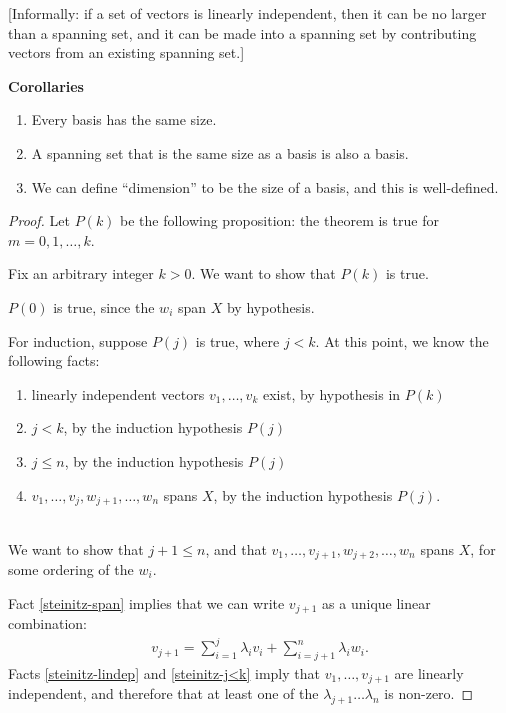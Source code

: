 \documentclass[12pt]{article}
\begin{document}
[Informally: if a set of vectors is linearly independent, then it can be no
larger than a spanning set, and it can be made into a spanning set by
contributing vectors from an existing spanning set.]

\textbf{Corollaries}
\begin{enumerate}
\item Every basis has the same size.
\item A spanning set that is the same size as a basis is also a basis.
\item We can define ``dimension'' to be the size of a basis, and this is
  well-defined.
\end{enumerate}

\begin{proof}
  Let $P(k)$ be the following proposition: the theorem is true for $m = 0, 1, \ldots, k$.

  Fix an arbitrary integer $k > 0$. We want to show that $P(k)$ is true.

  $P(0)$ is true, since the $w_i$ span $X$ by hypothesis.

  For induction, suppose $P(j)$ is true, where $j < k$. At this point, we know
  the following facts:~\\

  \begin{enumerate}[label=\roman*)]
  \item linearly independent vectors $v_1, \ldots, v_k$ exist, by hypothesis in
    $P(k)$ \label{steinitz-lindep}
  \item $j < k$, by the induction hypothesis $P(j)$ \label{steinitz-j<k}
  \item $j \leq n$, by the induction hypothesis $P(j)$ \label{steinitz-j-leq-n}
  \item $v_1, \ldots, v_j, w_{j+1}, \ldots, w_n$ spans $X$, by the induction
    hypothesis $P(j)$. \label{steinitz-span}
  \end{enumerate}
  ~\\
  We want to show that $j+1 \leq n$, and that
  $v_1, \ldots, v_{j+1}, w_{j+2}, \ldots, w_n$ spans $X$, for some ordering of
  the $w_i$.

  Fact \ref{steinitz-span} implies that we can write $v_{j+1}$ as a unique
  linear combination:
  \begin{align*}
    v_{j+1} = \sum_{i=1}^j \lambda_iv_i + \sum_{i=j+1}^n\lambda_iw_i.
  \end{align*}
  Facts \ref{steinitz-lindep} and \ref{steinitz-j<k} imply that
  $v_1, \ldots, v_{j+1}$ are linearly independent, and therefore that at least
  one of the $\lambda_{j+1} \ldots \lambda_n$ is non-zero.


\end{proof}
\end{document}

